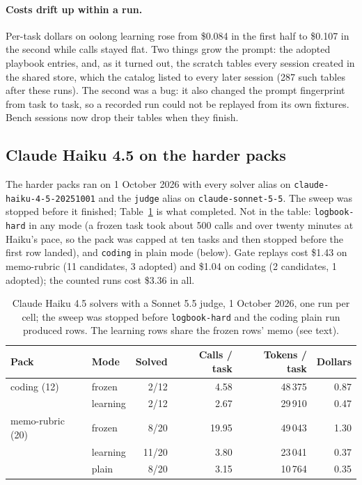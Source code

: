 \documentclass[11pt,a4paper]{article}
\newcommand{\code}[1]{\texttt{#1}}
\begin{document}
\paragraph{Costs drift up within a run.} Per-task dollars on oolong learning
rose from \$0.084 in the first half to \$0.107 in the second while calls stayed
flat. Two things grow the prompt: the adopted playbook entries, and, as it
turned out, the scratch tables every session created in the shared store, which
the catalog listed to every later session (287 such tables after these runs).
The second was a bug: it also changed the prompt fingerprint from task to task,
so a recorded run could not be replayed from its own fixtures. Bench sessions
now drop their tables when they finish.

\FloatBarrier
\subsection{Claude Haiku 4.5 on the harder packs}
\label{sec:haiku}

The harder packs ran on 1 October 2026 with every solver alias on
\code{claude-haiku-4-5-20251001} and the \code{judge} alias on
\code{claude-sonnet-5-5}. The sweep was stopped before it finished;
Table~\ref{tab:haiku} is what completed. Not in the table: \code{logbook-hard}
in any mode (a frozen task took about 500 calls and over twenty minutes at
Haiku's pace, so the pack was capped at ten tasks and then stopped before the
first row landed), and \code{coding} in plain mode (below). Gate replays cost
\$1.43 on memo-rubric (11 candidates, 3 adopted) and \$1.04 on coding (2
candidates, 1 adopted); the counted runs cost \$3.36 in all.

\begin{table}[htbp]
\centering
\small
\begin{tabular}{@{}llrrrr@{}}
\toprule
Pack & Mode & Solved & Calls / task & Tokens / task & Dollars \\
\midrule
coding (12)      & frozen   & 2/12  & 4.58  & 48\,375 & 0.87 \\
                 & learning & 2/12  & 2.67  & 29\,910 & 0.47 \\
\addlinespace
memo-rubric (20) & frozen   & 8/20  & 19.95 & 49\,043 & 1.30 \\
                 & learning & 11/20 & 3.80  & 23\,041 & 0.37 \\
                 & plain    & 8/20  & 3.15  & 10\,764 & 0.35 \\
\bottomrule
\end{tabular}
\caption{Claude Haiku 4.5 solvers with a Sonnet 5.5 judge, 1 October 2026, one
run per cell; the sweep was stopped before \code{logbook-hard} and the coding
plain run produced rows. The learning rows share the frozen rows' memo (see
text).}
\label{tab:haiku}
\end{table}
\end{document}
